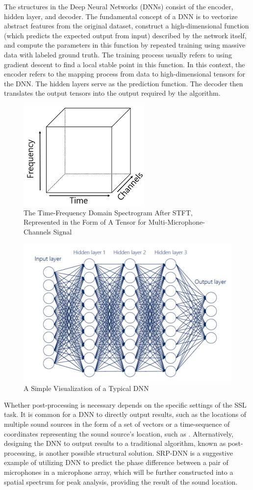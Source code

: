 The structures in the Deep Neural Networks (DNNs) consist of the encoder, hidden layer, and decoder. The fundamental concept of a DNN is to vectorize abstract features from the original dataset, construct a high-dimensional function (which predicts the expected output from input) described by the network itself, and compute the parameters in this function by repeated training using massive data with labeled ground truth. The training process usually refers to using gradient descent to find a local stable point in this function. In this context, the encoder refers to the mapping process from data to high-dimensional tensors for the DNN. The hidden layers serve as the prediction function. The decoder then translates the output tensors into the output required by the algorithm.

\begin{figure}[h]
    \centering
    \includegraphics[width=0.25\linewidth]{figures/STFT_Tensor.png}
    \caption{The Time-Frequency Domain Spectrogram After STFT, Represented in the Form of A Tensor for Multi-Microphone-Channels Signal}
\end{figure}

\begin{figure}[h]
    \centering
    \includegraphics[width=0.5\linewidth]{figures/DNN_example2.png}
    \caption{A Simple Visualization of a Typical DNN}
\end{figure}

Whether post-processing is necessary depends on the specific settings of the SSL task. It is common for a DNN to directly output results, such as the locations of multiple sound sources in the form of a set of vectors or a time-sequence of coordinates representing the sound source's location, such as \cite{adavanne_sound_2019} \cite{zhang_mtf-crnn_2020} \cite{phan_robust_2016} \cite{kim_multi-scale_2022}. Alternatively, designing the DNN to output results to a traditional algorithm, known as post-processing, is another possible structural solution. SRP-DNN \cite{yang_srp-dnn_2022} is a suggestive example of utilizing DNN to predict the phase difference between a pair of microphones in a microphone array, which will be further constructed into a spatial spectrum for peak analysis, providing the result of the sound location.